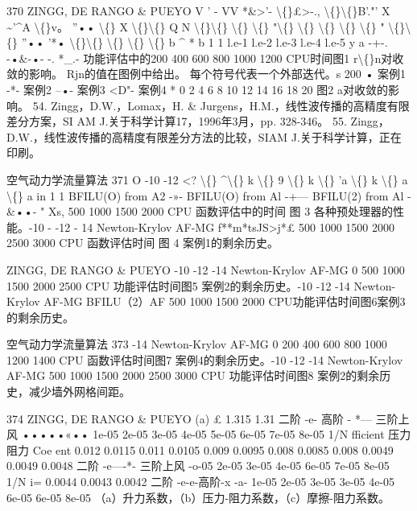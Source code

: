 \documentclass[UTF8,11pt,a4paper,openany,fontset=fandol]{ctexbook}
\begin{document}
370 ZINGG, DE RANGO \& PUEYO V ' - VV *\&>'- \textbackslash\{\}£>-., \textbackslash\{\}\textbackslash\{\}B'."' X \textasciitilde{}'\textasciicircum{}A \textbackslash\{\}v。 ''•• \textbackslash\{\} X \textbackslash\{\}\textbackslash\{\} Q N \textbackslash\{\}\textbackslash\{\} \textbackslash\{\} \textbackslash\{\} "\textbackslash\{\} \textbackslash\{\} \textbackslash\{\} \textbackslash\{\} \textbackslash\{\} " \textbackslash\{\}\textbackslash\{\} ''•• '*• \textbackslash\{\}\textbackslash\{\} \textbackslash\{\} \textbackslash\{\} \textbackslash\{\} b \textasciicircum{} * b 1 1 l.e-1 l.e-2 l.e-3 l.e-4 l.e-5 y a -+-. -•\&-•- -. *\_.- 功能评估中的200 400 600 800 1000 1200 CPU时间图1 r\textbackslash\{\}n对收敛的影响。 Rjn的值在图例中给出。 每个符号代表一个外部迭代。s 200 • 案例1 -*- 案例2 --•- 案例3 <D"- 案例4 * 0 2 4 6 8 10 12 14 16 18 20 图2 a对收敛的影响。 54. Zingg，D.W.，Lomax，H. \& Jurgens，H.M.，线性波传播的高精度有限差分方案，SI AM J.关于科学计算17，1996年3月，pp. 328-346。 55. Zingg，D.W.，线性波传播的高精度有限差分方法的比较，SIAM J.关于科学计算，正在印刷。

空气动力学流量算法 371 O -10 -12 <? \textbackslash\{\} \textasciicircum{}\textbackslash\{\} k \textbackslash\{\} 9 \textbackslash\{\} k \textbackslash\{\} 'a \textbackslash\{\} k \textbackslash\{\} a \textbackslash\{\} a in 1 1 BFILU(O) from A2 -»- BFILU(O) from Al -+--- BFILU(2) from Al -\&••- " Xs, 500 1000 1500 2000 CPU 函数评估中的时间 图 3 各种预处理器的性能。-10 - -12 - 14 Newton-Krylov AF-MG f**m*tsJS>j*£ 500 1000 1500 2000 2500 3000 CPU 函数评估时间 图 4 案例1的剩余历史。

ZINGG, DE RANGO \& PUEYO -10 -12 -14 Newton-Krylov AF-MG 0 500 1000 1500 2000 2500 CPU 功能评估时间图5 案例2的剩余历史。-10 -12 -14 Newton-Krylov AF-MG BFILU（2）AF 500 1000 1500 2000 CPU功能评估时间图6案例3的剩余历史。

空气动力学流量算法 373 -14 Newton-Krylov AF-MG 0 200 400 600 800 1000 1200 1400 CPU 函数评估时间图7 案例4的剩余历史。-10 -12 -14 Newton-Krylov AF-MG 500 1000 1500 2000 2500 3000 CPU 功能评估时间图8 案例2的剩余历史，减少墙外网格间距。

374 ZINGG, DE RANGO \& PUEYO (a) £ 1.315 1.31 二阶 -e- 高阶 - *--- 三阶上风 •••••«•• 1e-05 2e-05 3e-05 4e-05 5e-05 6e-05 7e-05 8e-05 1/N fficient 压力阻力 Coe ent 0.012 0.0115 0.011 0.0105 0.009 0.0095 0.008 0.0085 0.008 0.0049 0.0049 0.0048 二阶 -e----*- 三阶上风 -o-05 2e-05 3e-05 4e-05 6e-05 7e-05 8e-05 1/N i= 0.0044 0.0043 0.0042 二阶 -e-e-高阶-x -a- 1e-05 2e-05 3e-05 3e-05 4e-05 6e-05 6e-05 8e-05 （a）升力系数，（b）压力-阻力系数，（c）摩擦-阻力系数。
\end{document}
